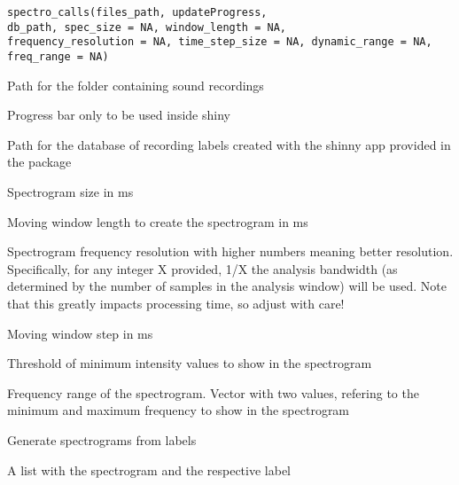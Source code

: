 \documentclass[letterpaper]{book}
\begin{document}
%
\begin{Usage}
\begin{verbatim}
spectro_calls(files_path, updateProgress,
db_path, spec_size = NA, window_length = NA,
frequency_resolution = NA, time_step_size = NA, dynamic_range = NA,
freq_range = NA)
\end{verbatim}
\end{Usage}
%
\begin{Arguments}
\begin{ldescription}
\item[\code{files\_path}] Path for the folder containing sound recordings

\item[\code{updateProgress}] Progress bar only to be used inside shiny

\item[\code{db\_path}] Path for the database of recording labels created with the
shinny app provided in the package

\item[\code{spec\_size}] Spectrogram size in ms

\item[\code{window\_length}] Moving window length to create the spectrogram in ms

\item[\code{frequency\_resolution}] Spectrogram frequency resolution with higher
numbers meaning better resolution. Specifically, for any integer X provided,
1/X the analysis bandwidth (as determined by the number of samples
in the analysis window) will be used. Note that this greatly impacts
processing time, so adjust with care!

\item[\code{time\_step\_size}] Moving window step in ms

\item[\code{dynamic\_range}] Threshold of minimum intensity values to show
in the spectrogram

\item[\code{freq\_range}] Frequency range of the spectrogram. Vector with two values,
refering to the minimum and maximum frequency to show in the spectrogram
\end{ldescription}
\end{Arguments}
%
\begin{Details}\relax
Generate spectrograms from labels
\end{Details}
%
\begin{Value}
A list with the spectrogram and the respective label
\end{Value}
\end{document}

